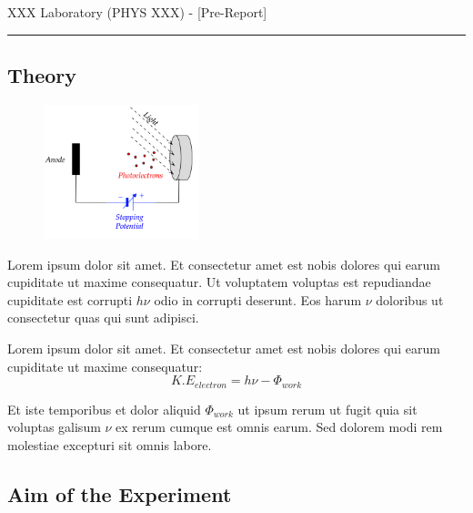 \documentclass[10pt]{article}
\begin{document}
\thispagestyle{fancy}

\begin{center}
{\LARGE XXX Laboratory (PHYS XXX) -  [Pre-Report]

\vspace{0.4cm}\floweroneright}

\rule{14cm}{0.4pt}
\end{center}


\subsection*{Theory}
\begin{figure} %
    \raggedright
    \vspace{-0.8cm}
    \includegraphics[width=0.4\textwidth]{theory_figure.png}
    \vspace{-0.9cm}
\end{figure}

Lorem ipsum dolor sit amet. Et consectetur amet est nobis dolores qui earum cupiditate ut maxime consequatur. Ut voluptatem voluptas est repudiandae cupiditate est corrupti $h \nu$  odio in corrupti deserunt. Eos harum $\nu$ doloribus ut consectetur quas qui sunt adipisci.
 
Lorem ipsum dolor sit amet. Et consectetur amet est nobis dolores qui earum cupiditate ut maxime consequatur:
 $$ {K.E}_{electron} = h \nu - \Phi_{work} $$

Et iste temporibus et dolor aliquid $\Phi_{work}$ ut ipsum rerum ut fugit quia sit voluptas galisum  $\nu$ ex rerum cumque est omnis earum. Sed dolorem modi rem molestiae excepturi sit omnis labore.

\vspace{0.2cm}

\subsection*{Aim of the Experiment}
\end{document}
